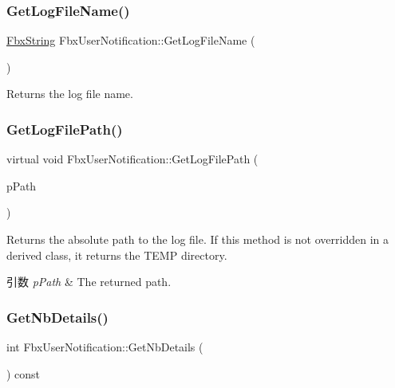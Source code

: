 \subsubsection{\texorpdfstring{Get\+Log\+File\+Name()}{GetLogFileName()}}
{\footnotesize\ttfamily \hyperlink{class_fbx_string}{Fbx\+String} Fbx\+User\+Notification\+::\+Get\+Log\+File\+Name (\begin{DoxyParamCaption}{ }\end{DoxyParamCaption})}

Returns the log file name. \mbox{\label{class_fbx_user_notification_af261ffb4073bb573710dc59b4881b759}} 
\subsubsection{\texorpdfstring{Get\+Log\+File\+Path()}{GetLogFilePath()}}
{\footnotesize\ttfamily virtual void Fbx\+User\+Notification\+::\+Get\+Log\+File\+Path (\begin{DoxyParamCaption}\item[{\hyperlink{class_fbx_string}{Fbx\+String} \&}]{p\+Path }\end{DoxyParamCaption})\hspace{0.3cm}{\ttfamily [virtual]}}

Returns the absolute path to the log file. If this method is not overridden in a derived class, it returns the T\+E\+MP directory. 
\begin{DoxyParams}{引数}
{\em p\+Path} & The returned path. \\
\hline
\end{DoxyParams}
\mbox{\label{class_fbx_user_notification_a1c5bdc6db66e58957abec1cc7d5349a2}} 
\subsubsection{\texorpdfstring{Get\+Nb\+Details()}{GetNbDetails()}}
{\footnotesize\ttfamily int Fbx\+User\+Notification\+::\+Get\+Nb\+Details (\begin{DoxyParamCaption}{ }\end{DoxyParamCaption}) const}



